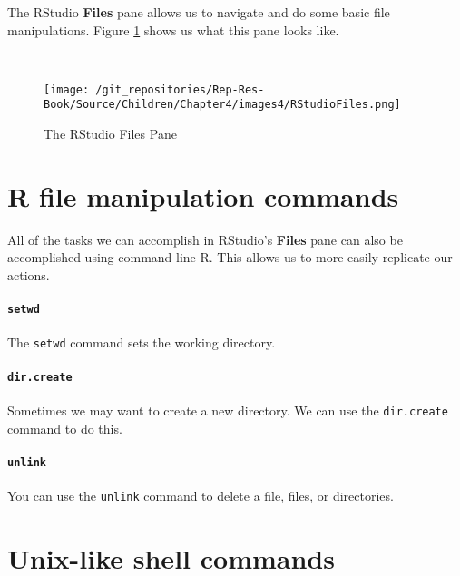 \documentclass[ChapterTOCs,krantz1]{krantz}\usepackage{graphicx, color}
\begin{document}
{{The RStudio {\bf{Files}} pane allows us to navigate and do some basic file manipulations. Figure \ref{FilesPane} shows us what this pane looks like.

\begin{figure}[t!]
    \caption{The RStudio Files Pane} \\[0.25cm]
    \label{FilesPane}
        \begin{center}    
        \texttt{[image: /git\_repositories/Rep-Res-Book/Source/Children/Chapter4/images4/RStudioFiles.png]}
        \end{center}
\end{figure}

\section{R file manipulation commands}

All of the tasks we can accomplish in RStudio's {\bf{Files}} pane can also be accomplished using command line R. This allows us to more easily replicate our actions. 

\paragraph{{\tt{setwd}}}

The {\tt{setwd}} command sets the working directory.

\paragraph{{\tt{dir.create}}}

Sometimes we may want to create a new directory. We can use the {\tt{dir.create}} command to do this.

\paragraph{{\tt{unlink}}}

You can use the {\tt{unlink}} command to delete a file, files, or directories. 

\section{Unix-like shell commands} 

}}
\end{document}
